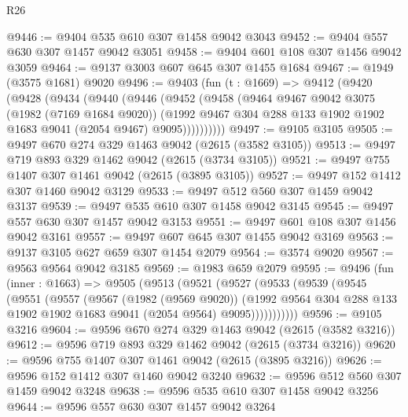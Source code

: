 \begin{lexlean}{R26}
\begin{coremodule}
@9446 := @9404 @535 @610 @307 @1458 @9042 @3043
@9452 := @9404 @557 @630 @307 @1457 @9042 @3051
@9458 := @9404 @601 @108 @307 @1456 @9042 @3059
@9464 := @9137 @3003 @607 @645 @307 @1455 @1684
@9467 := @1949 (@3575 @1681) @9020
@9496 := @9403
    (fun (t : @1669) =>
    @9412
      (@9420
        (@9428
          (@9434
            (@9440
              (@9446
                (@9452
                  (@9458
                    (@9464
                      @9467
                      @9042
                      @3075
                      (@1982 (@7169 @1684 @9020))
                      (@1992
                        @9467
                        @304
                        @288
                        @133
                        @1902
                        @1902
                        @1683
                        @9041
                        (@2054 @9467)
                        @9095))))))))))
@9497 := @9105 @3105
@9505 := @9497 @670 @274 @329 @1463 @9042 (@2615 (@3582 @3105))
@9513 := @9497 @719 @893 @329 @1462 @9042 (@2615 (@3734 @3105))
@9521 := @9497 @755 @1407 @307 @1461 @9042 (@2615 (@3895 @3105))
@9527 := @9497 @152 @1412 @307 @1460 @9042 @3129
@9533 := @9497 @512 @560 @307 @1459 @9042 @3137
@9539 := @9497 @535 @610 @307 @1458 @9042 @3145
@9545 := @9497 @557 @630 @307 @1457 @9042 @3153
@9551 := @9497 @601 @108 @307 @1456 @9042 @3161
@9557 := @9497 @607 @645 @307 @1455 @9042 @3169
@9563 := @9137 @3105 @627 @659 @307 @1454 @2079
@9564 := @3574 @9020
@9567 := @9563 @9564 @9042 @3185
@9569 := @1983 @659 @2079
@9595 := @9496
    (fun (inner : @1663) =>
    @9505
      (@9513
        (@9521
          (@9527
            (@9533
              (@9539
                (@9545
                  (@9551
                    (@9557
                      (@9567
                        (@1982 (@9569 @9020))
                        (@1992
                          @9564
                          @304
                          @288
                          @133
                          @1902
                          @1902
                          @1683
                          @9041
                          (@2054 @9564)
                          @9095)))))))))))
@9596 := @9105 @3216
@9604 := @9596 @670 @274 @329 @1463 @9042 (@2615 (@3582 @3216))
@9612 := @9596 @719 @893 @329 @1462 @9042 (@2615 (@3734 @3216))
@9620 := @9596 @755 @1407 @307 @1461 @9042 (@2615 (@3895 @3216))
@9626 := @9596 @152 @1412 @307 @1460 @9042 @3240
@9632 := @9596 @512 @560 @307 @1459 @9042 @3248
@9638 := @9596 @535 @610 @307 @1458 @9042 @3256
@9644 := @9596 @557 @630 @307 @1457 @9042 @3264

\end{coremodule}
\end{lexlean}

